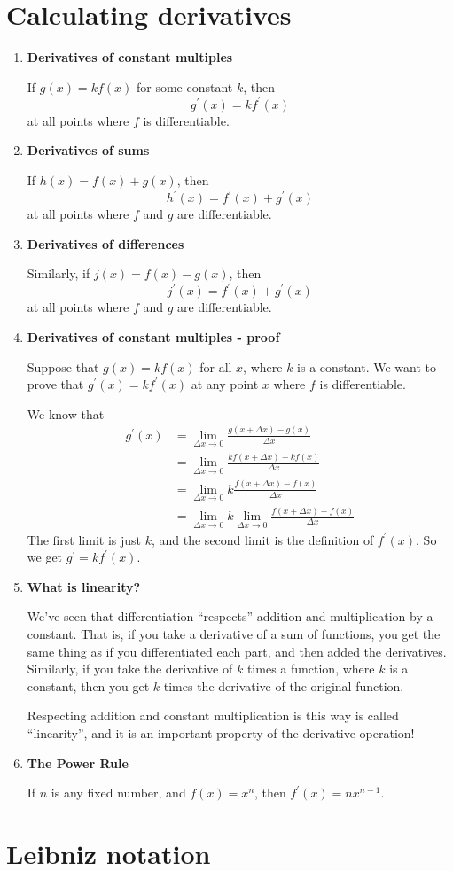 \section{Calculating derivatives}
\begin{enumerate}
    \item \textbf{Derivatives of constant multiples}

        If $g(x)=kf(x)$ for some constant $k$, then
        $$
        g^\prime(x)=kf^\prime(x)
        $$
        at all points where $f$ is differentiable.
    \item \textbf{Derivatives of sums}

        If $h(x)=f(x)+g(x)$, then
        $$
        h^\prime(x)=f^\prime(x)+g^\prime(x)
        $$
        at all points where $f$ and $g$ are differentiable.
    \item \textbf{Derivatives of differences}

        Similarly, if $j(x)=f(x)-g(x)$, then
        $$
        j^\prime(x)=f^\prime(x)+g^\prime(x)
        $$
        at all points where $f$ and $g$ are differentiable.
    \item \textbf{Derivatives of constant multiples - proof}

        Suppose that $g(x)=kf(x)$ for all $x$, where $k$ is a constant. We want to prove that $g^\prime(x)=kf^\prime(x)$ at any point $x$ where $f$ is differentiable.

        We know that
        \begin{align*}
            g^\prime(x) & =\lim_{\Delta x\to 0} \frac{g(x+\Delta x)-g(x)}{\Delta x} \\
                        & =\lim_{\Delta x\to 0} \frac{kf(x+\Delta x)-kf(x)}{\Delta x} \\
                        & =\lim_{\Delta x\to 0} k\frac{f(x+\Delta x)-f(x)}{\Delta x} \\
                        & =\lim_{\Delta x\to 0} k \lim_{\Delta x\to 0} \frac{f(x+\Delta x)-f(x)}{\Delta x}
        \end{align*}
        The first limit is just $k$, and the second limit is the definition of $f^\prime(x)$. So we get $g^\prime=kf^\prime(x)$.
    \item \textbf{What is linearity?}

        We've seen that differentiation ``respects'' addition and multiplication by a constant. That is, if you take a derivative of a sum of functions, you get the same thing as if you differentiated each part, and then added the derivatives. Similarly, if you take the derivative of $k$ times a function, where $k$ is a constant, then you get $k$ times the derivative of the original function.

        Respecting addition and constant multiplication is this way is called ``linearity'', and it is an important property of the derivative operation!
    \item \textbf{The Power Rule}

        If $n$ is any fixed number, and $f(x)=x^n$, then $f^\prime(x)=nx^{n-1}$.
\end{enumerate}

\section{Leibniz notation}
